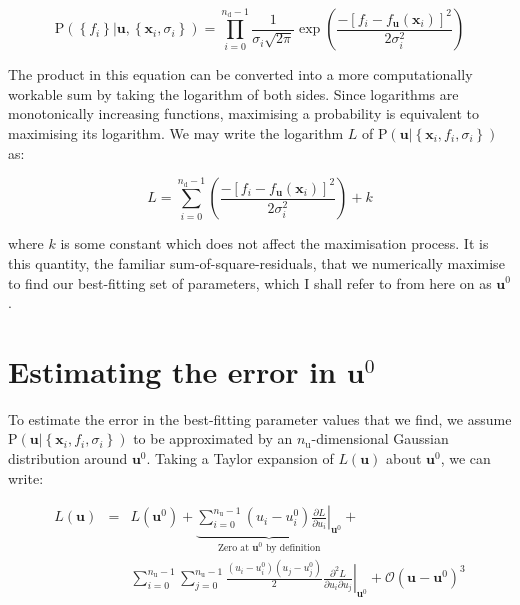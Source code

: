 \begin{equation}
\mathrm{P}\left( \left\{f_i \right\} | \mathbf{u}, \left\{ \mathbf{x}_i, \sigma_i \right\} \right)
=
\prod_{i=0}^{n_\mathrm{d}-1} \frac{1}{\sigma_i\sqrt{2\pi}} \exp \left(
\frac{
-\left[f_i - f_\mathbf{u}(\mathbf{x}_i)\right]^2
}{
2 \sigma_i^2
} \right)
\end{equation}

The product in this equation can be converted into a more computationally
workable sum by taking the logarithm of both sides. Since logarithms are
monotonically increasing functions, maximising a probability is equivalent to
maximising its logarithm. We may write the logarithm $L$ of $\mathrm{P}\left(
\mathbf{u} | \left\{ \mathbf{x}_i, f_i, \sigma_i \right\} \right)$ as:

\begin{equation}
L = \sum_{i=0}^{n_\mathrm{d}-1}
\left( \frac{
-\left[f_i - f_\mathbf{u}(\mathbf{x}_i)\right]^2
}{
2 \sigma_i^2
} \right) + k
\end{equation}

\noindent where $k$ is some constant which does not affect the maximisation
process. It is this quantity, the familiar sum-of-square-residuals, that we
numerically maximise to find our best-fitting set of parameters, which I shall
refer to from here on as $\mathbf{u}^0$.

\section{Estimating the error in $\mathbf{u}^0$}

To estimate the error in the best-fitting parameter values that we find, we
assume $\mathrm{P}\left( \mathbf{u} | \left\{ \mathbf{x}_i, f_i, \sigma_i
\right\} \right)$ to be approximated by an $n_\mathrm{u}$-dimensional Gaussian
distribution around $\mathbf{u}^0$. Taking a Taylor expansion of
$L(\mathbf{u})$ about $\mathbf{u}^0$, we can write:

\begin{eqnarray}
L(\mathbf{u}) & = & L(\mathbf{u}^0) +
    \underbrace{
      \sum_{i=0}^{n_\mathrm{u}-1} \left( u_i - u^0_i \right)
      \left.\frac{\partial L}{\partial u_i}\right|_{\mathbf{u}^0}
    }_{\textrm{Zero at $\mathbf{u}^0$ by definition}} + \label{eqa:L_taylor_expand}\\
& & \sum_{i=0}^{n_\mathrm{u}-1} \sum_{j=0}^{n_\mathrm{u}-1} \frac{\left( u_i - u^0_i \right) \left( u_j - u^0_j \right)}{2}
    \left.\frac{\partial^2 L}{\partial u_i \partial u_j}\right|_{\mathbf{u}^0} +
    \mathcal{O}\left( \mathbf{u} - \mathbf{u}^0\right)^3 \nonumber
\end{eqnarray}

